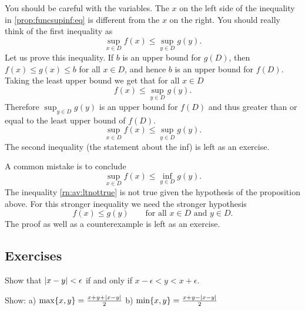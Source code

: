 You should be careful with the variables.  The $x$ on the left side of
the inequality in \eqref{prop:funcsupinf:eq}
is different from the $x$ on the right.  You
should really think of the first inequality as
\begin{equation*}
\sup_{x \in D} f(x) \leq \sup_{y \in D} g(y) .
\end{equation*}
Let us prove this inequality.  If $b$ is an upper bound for $g(D)$, then
$f(x) \leq g(x) \leq b$ for all $x \in D$, and hence $b$ is an upper bound for $f(D)$.
Taking the least upper bound we get that for all $x \in D$
\begin{equation*}
f(x) \leq \sup_{y \in D} g(y) .
\end{equation*}
Therefore
$\sup_{y \in D} g(y)$ is an upper bound for $f(D)$ and thus greater than or
equal to the least upper bound of $f(D)$.
\begin{equation*}
\sup_{x \in D} f(x) \leq \sup_{y \in D} g(y) .
\end{equation*}
The second inequality (the statement about the inf) is left as an exercise.

\medskip

A common mistake is to conclude 
\begin{equation} \label{rn:av:ltnottrue}
\sup_{x \in D} f(x) \leq \inf_{y \in D} g(y) .
\end{equation}
The inequality \eqref{rn:av:ltnottrue} is not true given the hypothesis of
the proposition above.  For this stronger
inequality we need the stronger hypothesis
\begin{equation*}
f(x) \leq g(y) \qquad \text{for all $x \in D$ and $y \in D$.}
\end{equation*}
The proof as well as a counterexample is left as an exercise.

\subsection{Exercises}

\begin{exercise}
Show that
$\left\lvert {x-y} \right\rvert < \epsilon$ if and only if $x-\epsilon < y < x+\epsilon$.
\end{exercise}

\begin{exercise}
Show: \qquad
a)
$\max \{x,y\} = \frac{x+y+\left\lvert {x-y} \right\rvert}{2}$
\qquad
b)
$\min \{x,y\} = \frac{x+y-\left\lvert {x-y} \right\rvert}{2}$
\end{exercise}

